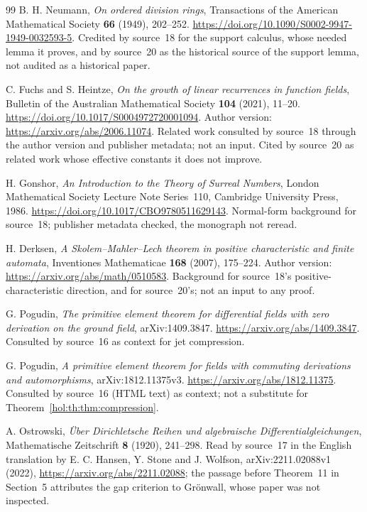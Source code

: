 \documentclass[11pt]{article}
\numberwithin{equation}{section}
\theoremstyle{definition}
\theoremstyle{remark}
\begin{document}
\begin{thebibliography}{99}
B. H. Neumann,
\emph{On ordered division rings},
Transactions of the American Mathematical Society \textbf{66} (1949),
202--252.
\url{https://doi.org/10.1090/S0002-9947-1949-0032593-5}.
Credited by source~18 for the support calculus, whose needed lemma it proves,
and by source~20 as the historical source of the support lemma, not audited
as a historical paper.

C. Fuchs and S. Heintze,
\emph{On the growth of linear recurrences in function fields},
Bulletin of the Australian Mathematical Society \textbf{104} (2021), 11--20.
\url{https://doi.org/10.1017/S0004972720001094}.
Author version: \url{https://arxiv.org/abs/2006.11074}. Related work consulted
by source~18 through the author version and publisher metadata; not an input.
Cited by source~20 as related work whose effective constants it does not
improve.

H. Gonshor,
\emph{An Introduction to the Theory of Surreal Numbers},
London Mathematical Society Lecture Note Series~110, Cambridge University
Press, 1986.
\url{https://doi.org/10.1017/CBO9780511629143}.
Normal-form background for source~18; publisher metadata checked, the
monograph not reread.

H. Derksen,
\emph{A Skolem--Mahler--Lech theorem in positive characteristic and finite
automata},
Inventiones Mathematicae \textbf{168} (2007), 175--224.
Author version: \url{https://arxiv.org/abs/math/0510583}.
Background for source~18's positive-characteristic direction, and for
source~20's; not an input to any proof.

G. Pogudin,
\emph{The primitive element theorem for differential fields with zero
derivation on the ground field}, arXiv:1409.3847.
\url{https://arxiv.org/abs/1409.3847}.
Consulted by source~16 as context for jet compression.

G. Pogudin,
\emph{A primitive element theorem for fields with commuting derivations and
automorphisms}, arXiv:1812.11375v3.
\url{https://arxiv.org/abs/1812.11375}.
Consulted by source~16 (HTML text) as context; not a substitute for
Theorem~\ref{hol:th:thm:compression}.

A. Ostrowski,
\emph{\"Uber Dirichletsche Reihen und algebraische Differentialgleichungen},
Mathematische Zeitschrift \textbf{8} (1920), 241--298.
Read by source~17 in the English translation by E. C. Hansen, Y. Stone and
J. Wolfson, arXiv:2211.02088v1 (2022),
\url{https://arxiv.org/abs/2211.02088}; the passage before Theorem~11 in
Section~5 attributes the gap criterion to Gr\"onwall, whose paper was not
inspected.


\end{thebibliography}
\end{document}
